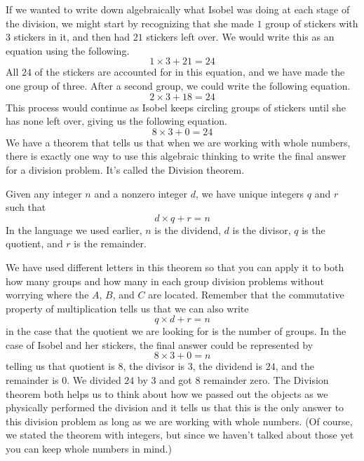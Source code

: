 \documentclass{ximera}
\begin{document}
If we wanted to write down algebraically what Isobel was doing at each stage of the division, we might start by recognizing that she made $1$ group of stickers with $3$ stickers in it, and then had $21$ stickers left over. We would write this as an equation using the following.
\[
1 \times 3 + 21 = 24
\]
All $24$ of the stickers are accounted for in this equation, and we have made the one group of three. After a second group, we could write the following equation.
\[
2 \times 3 + 18 = 24
\]
This process would continue as Isobel keeps circling groups of stickers until she has none left over, giving us the following equation.
\[
8 \times 3 + 0 = 24
\]
We have a theorem that tells us that when we are working with whole numbers, there is exactly one way to use this algebraic thinking to write the final answer for a division problem. It's called the Division theorem.
\begin{theorem}
Given any integer $n$ and a nonzero integer $d$, we have unique integers $q$ and $r$ such that 
\[
d \times q + r = n
\]
In the language we used earlier, $n$ is the dividend, $d$ is the divisor, $q$ is the quotient, and $r$ is the remainder.
\end{theorem}
We have used different letters in this theorem so that you can apply it to both how many groups and how many in each group division problems without worrying where the $A$, $B$, and $C$ are located. Remember that the commutative property of multiplication tells us that we can also write 
\[q \times d + r = n
\]
in the case that the quotient we are looking for is the number of groups. In the case of Isobel and her stickers, the final answer could be represented by 
\[
8 \times 3 + 0 = n
\]
telling us that quotient is $8$, the divisor is $3$, the dividend is $24$, and the remainder is $0$. We divided $24$ by $3$ and got $8$ remainder zero. The Division theorem both helps us to think about how we passed out the objects as we physically performed the division and it tells us that this is the only answer to this division problem as long as we are working with whole numbers. (Of course, we stated the theorem with integers, but since we haven't talked about those yet you can keep whole numbers in mind.)
\end{document}
